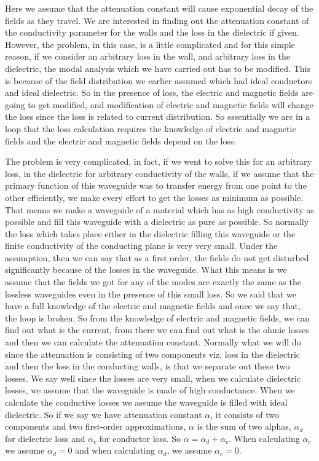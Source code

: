 Here we assume that the attenuation constant will cause exponential decay of the fields as they travel. We are interested in finding out the attenuation constant of the conductivity parameter for the walls and the loss in the dielectric if given. However, the problem, in this case, is a little complicated and for this simple reason, if we consider an arbitrary loss in the wall, and arbitrary loss in the dielectric, the modal analysis which we have carried out has to be modified. This is because of the field distribution we earlier assumed which had ideal conductors and ideal dielectric. So in the presence of loss, the electric and magnetic fields are going to get modified, and modification of electric and magnetic fields will change the loss since the loss is related to current distribution. So essentially we are in a loop that the loss calculation requires the knowledge of electric and magnetic fields and the electric and magnetic fields depend on the loss.
	
The problem is very complicated, in fact, if we went to solve this for an arbitrary loss, in the dielectric for arbitrary conductivity of the walls, if we assume that the primary function of this waveguide was to transfer energy from one point to the other efficiently, we make every effort to get the losses as minimum as possible. That means we make a waveguide of a material which has as high conductivity as possible and fill this waveguide with a dielectric as pure as possible. So normally the loss which takes place either in the dielectric filling this waveguide or the finite conductivity of the conducting plane is very very small. Under the assumption, then we can say that as a first order, the fields do not get disturbed significantly because of the losses in the waveguide. What this means is we assume that the fields we got for any of the modes are exactly the same as the lossless waveguides even in the presence of this small loss. So we said that we have a full knowledge of the electric and magnetic fields and once we say that, the loop is broken. So from the knowledge of electric and magnetic fields, we can find out what is the current, from there we can find out what is the ohmic losses and then we can calculate the attenuation constant. Normally what we will do since the attenuation is consisting of two components viz, loss in the dielectric and then the loss in the conducting walls, is that we separate out these two losses. We say well since the losses are very small, when we calculate dielectric losses, we assume that the waveguide is made of high conductance. When we calculate the conductive losses we assume the waveguide is filled with ideal dielectric. So if we say we have attenuation constant $\alpha$, it consists of two components and two first-order approximations, $\alpha$ is the sum of two alphas, $\alpha_{d}$ for dielectric loss and  $\alpha_{c}$ for conductor loss. So $\alpha =  \alpha_{d} +  \alpha_{c}$. When calculating $\alpha_{c}$ we assume  $\alpha_{d} = 0$ and when calculating  $\alpha_{d}$, we assume  $\alpha_{c} = 0$.
	

